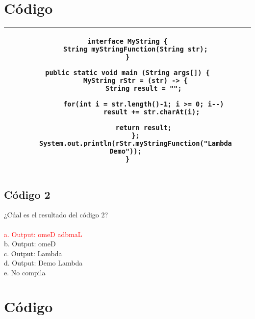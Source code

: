 \documentclass[spanish,english]{article}
\begin{document}
\section{Código}

\item[\hspace*{1cm} \hspace*{1cm}
\hspace*{1cm} \hspace*{1cm}]
\begin{tabular}{|c|}
\hline 
\begin{lstlisting}
interface MyString {
	String myStringFunction(String str);
}

public static void main (String args[]) {
	MyString rStr = (str) -> {
		String result = "";
		
		for(int i = str.length()-1; i >= 0; i--)
			result += str.charAt(i);
		
		return result;
	};
	System.out.println(rStr.myStringFunction("Lambda Demo")); 
}
\end{lstlisting}
\hspace*{1cm} \hspace*{1cm} \hspace*{1cm} \hspace*{1cm} \tabularnewline
\hline 
\end{tabular}

\subsection{Código 2}

¿Cúal es el resultado del código 2?\\\\
\textcolor{red}{a. Output: omeD adbmaL}\\
b. Output: omeD\\
c. Output: Lambda \\
d. Output: Demo Lambda\\
e. No compila\\

\section{Código}
\end{document}
